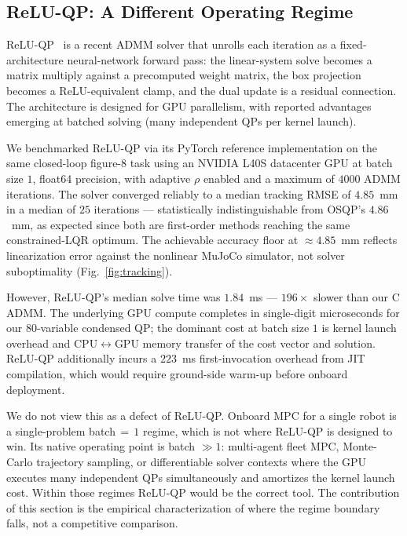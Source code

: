 \documentclass[conference]{IEEEtran}
\begin{document}
\subsection{ReLU-QP: A Different Operating Regime}
\label{sec:reluqp}

ReLU-QP~\cite{bishop2024reluqp} is a recent ADMM solver that unrolls each iteration as a fixed-architecture neural-network forward pass: the linear-system solve becomes a matrix multiply against a precomputed weight matrix, the box projection becomes a ReLU-equivalent clamp, and the dual update is a residual connection. The architecture is designed for GPU parallelism, with reported advantages emerging at batched solving (many independent QPs per kernel launch).

We benchmarked ReLU-QP via its PyTorch reference implementation on the same closed-loop figure-8 task using an NVIDIA L40S datacenter GPU at batch size $1$, float64 precision, with adaptive $\rho$ enabled and a maximum of $4000$ ADMM iterations. The solver converged reliably to a median tracking RMSE of $4.85$~mm in a median of $25$ iterations --- statistically indistinguishable from OSQP's $4.86$~mm, as expected since both are first-order methods reaching the same constrained-LQR optimum. The achievable accuracy floor at $\approx 4.85$~mm reflects linearization error against the nonlinear MuJoCo simulator, not solver suboptimality (Fig.~\ref{fig:tracking}).

However, ReLU-QP's median solve time was $1.84$~ms --- $196\times$ slower than our C ADMM. The underlying GPU compute completes in single-digit microseconds for our $80$-variable condensed QP; the dominant cost at batch size $1$ is kernel launch overhead and CPU$\leftrightarrow$GPU memory transfer of the cost vector and solution. ReLU-QP additionally incurs a $223$~ms first-invocation overhead from JIT compilation, which would require ground-side warm-up before onboard deployment.

We do not view this as a defect of ReLU-QP. Onboard MPC for a single robot is a single-problem batch$\,{=}\,1$ regime, which is not where ReLU-QP is designed to win. Its native operating point is batch $\gg 1$: multi-agent fleet MPC, Monte-Carlo trajectory sampling, or differentiable solver contexts where the GPU executes many independent QPs simultaneously and amortizes the kernel launch cost. Within those regimes ReLU-QP would be the correct tool. The contribution of this section is the empirical characterization of where the regime boundary falls, not a competitive comparison.
\end{document}
